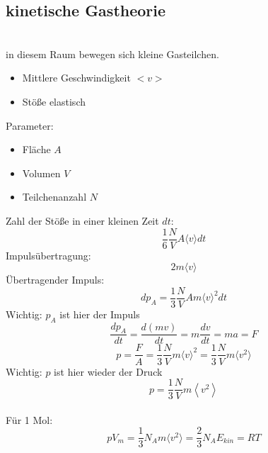 \documentclass[a4paper]{article}
\begin{document}
\subsection{kinetische Gastheorie}
\\
in diesem Raum bewegen sich kleine Gasteilchen.
\begin{itemize}
    \item Mittlere Geschwindigkeit $<v>$
    \item Stöße elastisch
\end{itemize}
Parameter:
\begin{itemize}
    \item Fläche $A$
    \item Volumen $V$
    \item Teilchenanzahl $N$
\end{itemize}
Zahl der Stöße in einer kleinen Zeit $dt$:
\begin{equation*}
    \frac{1}{6} \frac{N}{V}A\langle v\rangle dt
\end{equation*}
Impulsübertragung:
\begin{equation*}
    2m\langle v \rangle
\end{equation*}
Übertragender Impuls:
\begin{equation*}
    dp_A = \frac{1}{3}\frac{N}{V}Am \langle v \rangle ^2 dt
\end{equation*}
Wichtig: $p_A$ ist hier der Impuls
\begin{equation*}
    \frac{dp_A}{dt}=\frac{d\left(mv\right)}{dt}=m\frac{dv}{dt}=ma=F
\end{equation*}
\begin{equation*}
    p = \frac{F}{A}=\frac{1}{3}\frac{N}{V}m\langle v\rangle ^2= \frac{1}{3}\frac{N}{V}m \langle v^2 \rangle
\end{equation*}
Wichtig: $p$ ist hier wieder der Druck
\begin{equation*}
    p=\frac{1}{3}\frac{N}{V}m\left\langle v^2 \right\rangle 
\end{equation*}
\\
Für 1 Mol:
\begin{equation*}
    pV_m=\frac{1}{3}N_Am\langle v^2\rangle = \frac{2}{3}N_AE_{kin}=RT
\end{equation*}
\end{document}
